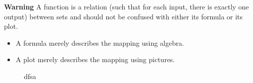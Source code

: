 \documentclass{ximera}
\theoremstyle{definition}
\begin{document}
\textbf{Warning} A function is a relation (such that for each input, there is exactly one output) between sets and should not be confused with either its formula or its plot.
\begin{itemize}
	\item A formula merely describes the mapping using algebra.
	\item A plot merely describes the mapping using pictures.
\end{itemize}
\begin{figure}[h]
	\centering
	\caption{dfsa}
\end{figure}
\end{document}
